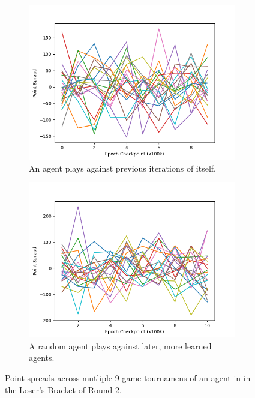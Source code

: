 
\begin{figure}
\center

\begin{subfigure}[b]{0.90\textwidth}
	\includegraphics[width=\linewidth]{images/findings/round2/spreads_self-v-prev_loser.png}
	\caption{An agent plays against previous iterations of itself.}
	\label{fig:r2-spreads-loser-a}
\end{subfigure}

\begin{subfigure}[b]{0.90\textwidth}
	\includegraphics[width=\linewidth]{images/findings/round2/spreads_rand-v-fut_loser.png}
	\caption{A random agent plays against later, more learned agents.}
	\label{fig:r2-spreads-loser-b}
\end{subfigure}

\caption{
	Point spreads across mutliple 9-game tournamens of an agent in in the
	Loser's Bracket of Round 2.
}
\label{fig:r2-spreads-loser}
\end{figure}
